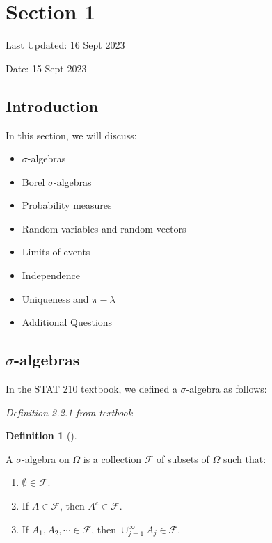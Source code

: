\documentclass[
  letterpaper,
  DIV=11,
  numbers=noendperiod]{scrreprt}
\providecommand{\tightlist}{%
  \setlength{\itemsep}{0pt}\setlength{\parskip}{0pt}}\usepackage{longtable,booktabs,array}
\theoremstyle{plain}
\theoremstyle{definition}
\newtheorem{definition}{Definition}[chapter]
\theoremstyle{remark}
\begin{document}

\hypertarget{section-1}{%
\chapter*{Section 1}\label{section-1}}


Last Updated: 16 Sept 2023

Date: 15 Sept 2023

\hypertarget{introduction}{%
\section*{Introduction}\label{introduction}}


In this section, we will discuss:

\begin{itemize}
\tightlist
\item
  \(\sigma\)-algebras
\item
  Borel \(\sigma\)-algebras
\item
  Probability measures
\item
  Random variables and random vectors
\item
  Limits of events
\item
  Independence
\item
  Uniqueness and \(\pi-\lambda\)
\item
  Additional Questions
\end{itemize}

\hypertarget{sigma-algebras}{%
\section*{\texorpdfstring{\(\sigma\)-algebras}{\textbackslash sigma-algebras}}\label{sigma-algebras}}


In the STAT 210 textbook, we defined a \(\sigma\)-algebra as follows:

\emph{Definition 2.2.1 from textbook}

\leavevmode{}%
\begin{definition}[]\label{def-sigma-algebra}

A \(\sigma\)-algebra on \(\Omega\) is a collection \(\mathcal{F}\) of
subsets of \(\Omega\) such that:

\begin{enumerate}
\def\labelenumi{\arabic{enumi}.}
\item
  \(\emptyset \in \mathcal{F}\).
\item
  If \(A \in \mathcal{F}\), then \(A^c \in \mathcal{F}\).
\item
  If \(A_1, A_2, \cdots \in \mathcal{F}\), then
  \(\cup_{j=1}^{\infty} A_j \in \mathcal{F}\).
\end{enumerate}

\end{definition}
\end{document}
